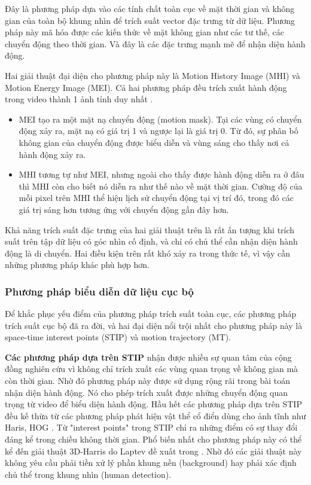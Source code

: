 Đây là phương pháp dựa vào các tính chất toàn cục về mặt thời gian và không gian của toàn bộ khung nhìn để trích suất vector đặc trưng từ dữ liệu. Phương pháp này mã hóa được các kiến thức về mặt không gian như các tư thế, các chuyển động theo thời gian. Và đây là các đặc trưng mạnh mẽ để nhận diện hành động.

Hai giải thuật đại diện cho phương pháp này là Motion History Image (MHI) và Motion Energy Image (MEI). Cả hai phương pháp đều trích xuất hành động trong video thành 1 ảnh tỉnh duy nhất \cite{ahad2012motion}.

\begin{itemize}
    \item MEI tạo ra một mặt nạ chuyển động (motion mask). Tại các vùng có chuyển động xảy ra, mặt nạ có giá trị 1 và ngược lại là giá trị 0. Từ đó, sự phân bố không gian của chuyển động được biểu diễn và vùng sáng cho thấy nơi cả hành động xảy ra.
    \item MHI tương tự như MEI, nhưng ngoài cho thấy được hành động diễn ra ở đâu thì MHI còn cho biết nó diễn ra như thế nào về mặt thời gian. Cường độ của mỗi pixel trên MHI thể hiện lịch sử chuyển động tại vị trí đó, trong đó các giá trị sáng hơn tương ứng với chuyển động gần đây hơn.
\end{itemize}

Khả năng trích suất đặc trưng của hai giải thuật trên là rất ấn tượng khi trích suất trên tập dữ liệu có góc nhìn cố định, và chỉ có chủ thể cần nhận diện hành động là di chuyển. Hai điều kiện trên rất khó xảy ra trong thức tế, vì vậy cần những phương pháp khác phù hợp hơn.

\subsubsection{Phương pháp biểu diễn dữ liệu cục bộ}

Để khắc phục yếu điểm của phương pháp trích suất toàn cục, các phương pháp trích suất cục bộ đã ra đời, và hai đại diện nổi trội nhất cho phương pháp này là space-time interest points (STIP) và motion trajectory (MT).

\textbf{Các phương pháp dựa trên STIP} nhận được nhiều sự quan tâm của cộng đồng nghiên cứu vì không chỉ trích xuất các vùng quan trọng về không gian mà còn thời gian. Nhờ đó phương pháp này được sử dụng rộng rãi trong bài toán nhận diện hành động. Nó cho phép trích xuất được những chuyển động quan trọng từ video để biểu diện hành động. Hầu hết các phương pháp dựa trên STIP đều kế thừa từ các phương pháp phát hiện vật thể cổ điển dùng cho ảnh tĩnh như Haris, HOG \cite{seemanthini2018human}. Từ "interest points" trong STIP chỉ ra những điểm có sự thay đổi đáng kể trong chiều không thời gian. Phổ biến nhất cho phương pháp này có thể kể đến giải thuật 3D-Harris do Laptev đề xuất trong \cite{laptev2005space}. Nhờ đó các giải thuật này không yêu cầu phải tiền xử lý phần khung nền (background) hay phải xác định chủ thể trong khung nhìn (human detection).

